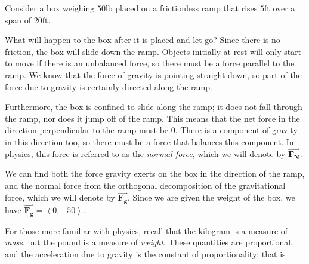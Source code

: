 \documentclass{ximera}
\begin{document}
\begin{example}
  Consider a box weighing $50\mathrm{lb}$ placed on a frictionless ramp that rises
  $5\mathrm{ft}$ over a span of $20\mathrm{ft}$.
  \begin{image}
  \end{image}
  
What will happen to the box after it is placed and let go?  Since there is no friction, the box will slide down the ramp.  Objects initially at rest will only start to move if there is an unbalanced force, so there must be a force parallel to the ramp.  We know that the force of gravity is pointing straight down, so part of the force due to gravity is certainly directed along the ramp.  
  
Furthermore, the box is confined to slide along the ramp; it does not fall through the ramp, nor does it jump off of the ramp.  This means that the net force in the direction perpendicular to the ramp must be $0$.  There is a component of gravity in this direction too, so there must be a force that balances this component.  In physics, this force is referred to as the \emph{normal force}, which we will denote by $\overset{\boldsymbol{\rightharpoonup}}{\mathbf{F_N}}$.  

We can find both the force gravity exerts on the box in the direction of the ramp, and the normal force from the orthogonal decomposition of the gravitational force, which we will denote by $\overset{\boldsymbol{\rightharpoonup}}{\mathbf{F_g}}$.  Since we are given the weight of the box, we have $\overset{\boldsymbol{\rightharpoonup}}{\mathbf{F_g}} =   \left< 0,-50 \right>$.


\begin{remark}
For those more familiar with physics, recall that the kilogram is a measure of \emph{mass}, but the pound is a measure of \emph{weight}.  These quantities are proportional, and the acceleration due to gravity is the constant of proportionality; that is 


\end{remark}
\end{example}
\end{document}
